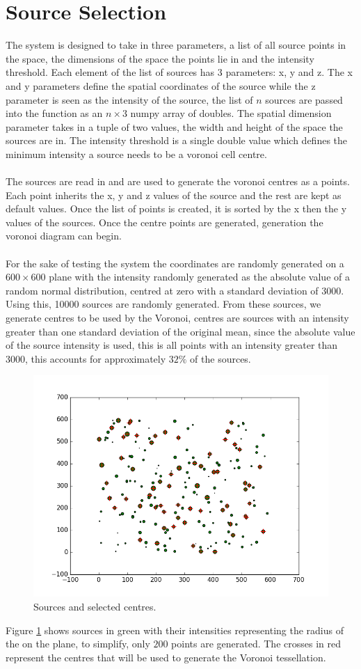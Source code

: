 \section{Source Selection}
The system is designed to take in three parameters, a list of all source points in the space, the dimensions of the space the points lie in and the intensity threshold. Each element of the list of sources has 3 parameters: x, y and z. The x and y parameters define the spatial coordinates of the source while the z parameter is seen as the intensity of the source, the list of $n$ sources are passed into the function as an $n \times 3$ numpy array of doubles. The spatial dimension parameter takes in a tuple of two values, the width and height of the space the sources are in. The intensity threshold is a single double value which defines the minimum intensity a source needs to be a voronoi cell centre.
\\
\\
The sources are read in and are used to generate the voronoi centres as a points. Each point inherits the x, y and z values of the source and the rest are kept as default values. Once the list of points is created, it is sorted by the x then the y values of the sources. Once the centre points are generated, generation the voronoi diagram can begin.
\\
\\
For the sake of testing the system the coordinates are randomly generated on a $600 \times 600$ plane with the intensity randomly generated as the absolute value of a random normal distribution, centred at zero with a standard deviation of $3000$. Using this, 10000 sources are randomly generated. From these sources, we generate centres to be used by the Voronoi, centres are sources with an intensity greater than one standard deviation of the original mean, since the absolute value of the source intensity is used, this is all points with an intensity greater than 3000, this accounts for approximately $32\%$ of the sources.
\begin{figure}[H]
\includegraphics[width=\textwidth]{Images/sources.png}
\caption{Sources and selected centres.}
\label{fig:source}
\end{figure}
Figure \ref{fig:source} shows sources in green with their intensities representing the radius of the on the plane, to simplify, only $200$ points are generated. The crosses in red represent the centres that will be used to generate the Voronoi tessellation.